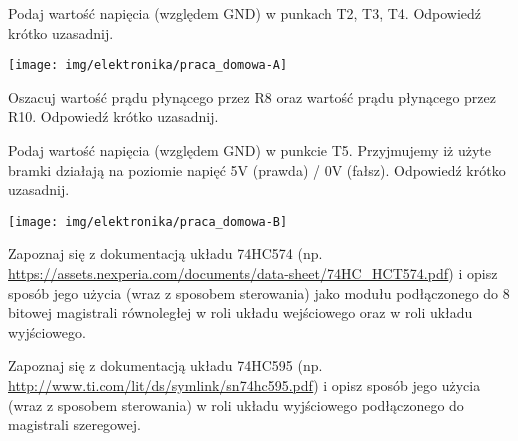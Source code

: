 \documentclass{pdfBooklets}
\begin{document}
\begin{ZadanieDomowe} [3pkt]
Podaj wartość napięcia (względem GND) w punkach T2, T3, T4. Odpowiedź krótko uzasadnij.
\end{ZadanieDomowe}

\begin{center}
    \texttt{[image: img/elektronika/praca\_domowa-A]}
\end{center}

\begin{ZadanieDomowe} [2pkt]
Oszacuj wartość prądu płynącego przez R8 oraz wartość prądu płynącego przez R10. Odpowiedź krótko uzasadnij.
\end{ZadanieDomowe}

\begin{ZadanieDomowe} [1pkt]
Podaj wartość napięcia (względem GND) w punkcie T5. Przyjmujemy iż użyte bramki działają na poziomie napięć 5V (prawda) / 0V (fałsz). Odpowiedź krótko uzasadnij.
\end{ZadanieDomowe}

\begin{center}
    \texttt{[image: img/elektronika/praca\_domowa-B]}
\end{center}

\begin{ZadanieDomowe} [2pkt]
Zapoznaj się z dokumentacją układu 74HC574 (np. \url{https://assets.nexperia.com/documents/data-sheet/74HC_HCT574.pdf}) i opisz sposób jego użycia (wraz z sposobem sterowania) jako modułu podłączonego do 8 bitowej magistrali równoległej w roli układu wejściowego oraz w roli układu wyjściowego.
\end{ZadanieDomowe}

\begin{ZadanieDomowe} [2pkt]
Zapoznaj się z dokumentacją układu 74HC595 (np. \url{http://www.ti.com/lit/ds/symlink/sn74hc595.pdf}) i opisz sposób jego użycia (wraz z sposobem sterowania) w roli układu wyjściowego podłączonego do magistrali szeregowej.
\end{ZadanieDomowe}

\end{document}
